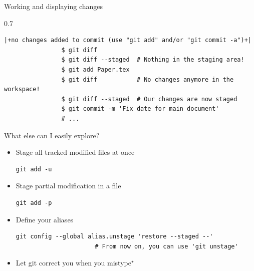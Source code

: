 \documentclass[usenames,svgnames,14pt]{beamer}
\begin{document}
\begin{frame}[fragile]{Working and displaying changes}
\begin{overlayarea}{\textwidth}{0.7\textheight}
\begin{onlyenv}
\begin{lstlisting}[style=MyBash, aboveskip=2mm, xleftmargin=-6mm, xrightmargin=-6mm]
                |+no changes added to commit (use "git add" and/or "git commit -a")+|
                $ git diff
                $ git diff --staged  # Nothing in the staging area!
                $ git add Paper.tex
                $ git diff           # No changes anymore in the workspace!
                $ git diff --staged  # Our changes are now staged
                $ git commit -m 'Fix date for main document'
                # ...
            \end{lstlisting}
        \end{onlyenv}
    \end{overlayarea}
\end{frame}
\begin{frame}[fragile]{What else can I easily explore?}
        \setlength{\itemsep}{5pt}
    \begin{itemize}
        \item Stage all tracked modified files at once\\[1mm]
              \begin{minipage}{\linewidth}
                  \begin{lstlisting}[style=MyBash]
                      git add -u
                  \end{lstlisting}
              \end{minipage}
        \item Stage partial modification in a file\\[1mm]
              \begin{minipage}{\linewidth}
                  \begin{lstlisting}[style=MyBash]
                      git add -p
                  \end{lstlisting}
              \end{minipage}
        \item Define your aliases\\[1mm]
              \begin{minipage}{\linewidth}
                  \begin{lstlisting}[style=MyBash]
                      git config --global alias.unstage 'restore --staged --'
                      # From now on, you can use 'git unstage'
                  \end{lstlisting}
              \end{minipage}
        \item Let git correct you when you mistype$^\star$\\[1mm]

\end{itemize}
\end{frame}
\end{document}
